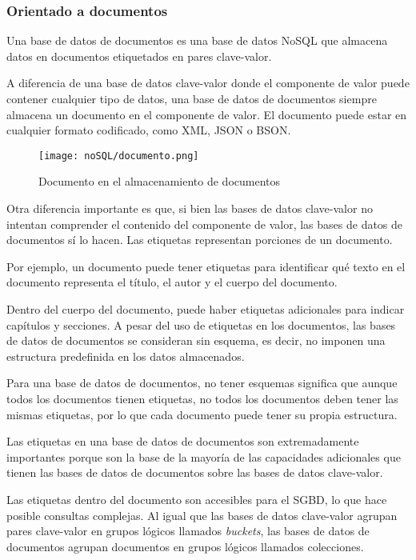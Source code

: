 \subsubsection{Orientado a documentos}
Una base de datos de documentos es una base de datos NoSQL que almacena datos en documentos etiquetados en pares clave-valor.


A diferencia de una base de datos clave-valor donde el componente de valor puede contener cualquier tipo de datos, una base de datos de documentos siempre almacena un documento en el componente de valor. El documento puede estar en cualquier formato codificado, como XML, JSON o BSON.


\begin{figure}[h!t]
    \centering
    \texttt{[image: noSQL/documento.png]}
    \caption{Documento en el almacenamiento de documentos}
    \label{img:documentos-documento}
\end{figure}
Otra diferencia importante es que, si bien las bases de datos clave-valor no intentan comprender el contenido del componente de valor, las bases de datos de documentos sí lo hacen. Las etiquetas representan porciones de un documento.


Por ejemplo, un documento puede tener etiquetas para identificar qué texto en el documento representa el título, el autor y el cuerpo del documento.


Dentro del cuerpo del documento, puede haber etiquetas adicionales para indicar capítulos y secciones. A pesar del uso de etiquetas en los documentos, las bases de datos de documentos se consideran sin esquema, es decir, no imponen una estructura predefinida en los datos almacenados.


Para una base de datos de documentos, no tener esquemas significa que aunque todos los documentos tienen etiquetas, no todos los documentos deben tener las mismas etiquetas, por lo que cada documento puede tener su propia estructura.


Las etiquetas en una base de datos de documentos son extremadamente importantes porque son la base de la mayoría de las capacidades adicionales que tienen las bases de datos de documentos sobre las bases de datos clave-valor.


Las etiquetas dentro del documento son accesibles para el SGBD, lo que hace posible consultas complejas. Al igual que las bases de datos clave-valor agrupan pares clave-valor en grupos lógicos llamados \textit{buckets}, las bases de datos de documentos agrupan documentos en grupos lógicos llamados colecciones.


